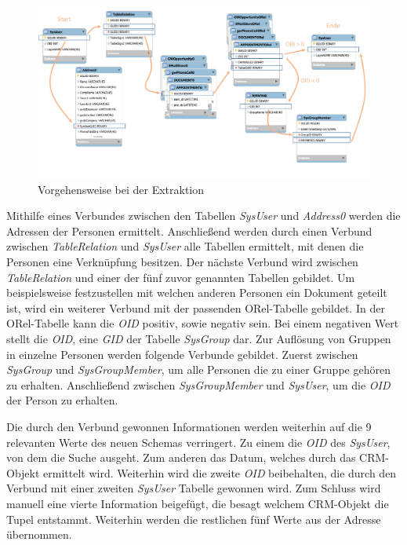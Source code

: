\begin{figure}[htbp]
\centering
  \includegraphics[width=1.0\textwidth]{pics/konzept_extraktion.pdf}
\caption{Vorgehensweise bei der Extraktion}
\label{umsetzung_extract}
\end{figure} 

Mithilfe eines Verbundes zwischen den Tabellen \textit{SysUser} und \textit{Address0} werden die Adressen der Personen ermittelt. Anschließend werden durch einen Verbund zwischen \textit{TableRelation} und \textit{SysUser} alle Tabellen ermittelt, mit denen die Personen eine Verknüpfung besitzen. Der nächste Verbund wird zwischen \textit{TableRelation} und einer der fünf zuvor genannten Tabellen gebildet. Um beispielsweise festzustellen mit welchen anderen Personen ein Dokument geteilt ist, wird ein weiterer Verbund mit der passenden ORel-Tabelle gebildet. In der ORel-Tabelle kann die \textit{OID} positiv, sowie negativ sein. Bei einem negativen Wert stellt die \textit{OID}, eine \textit{GID} der Tabelle \textit{SysGroup} dar. Zur Auflösung von Gruppen in einzelne Personen werden folgende Verbunde gebildet. Zuerst zwischen \textit{SysGroup} und \textit{SysGroupMember}, um alle Personen die zu einer Gruppe gehören zu erhalten. Anschließend zwischen \textit{SysGroupMember} und \textit{SysUser}, um die \textit{OID} der Person zu erhalten. 

Die durch den Verbund gewonnen Informationen werden weiterhin auf die 9 relevanten Werte des neuen Schemas verringert. Zu einem die \textit{OID} des \textit{SysUser}, von dem die Suche ausgeht. Zum anderen das Datum, welches durch das CRM-Objekt ermittelt wird. Weiterhin wird die zweite \textit{OID} beibehalten, die durch den Verbund mit einer zweiten \textit{SysUser} Tabelle gewonnen wird. Zum Schluss wird manuell eine vierte Information beigefügt, die besagt welchem CRM-Objekt die Tupel entstammt. Weiterhin werden die restlichen fünf Werte aus der Adresse übernommen. 

